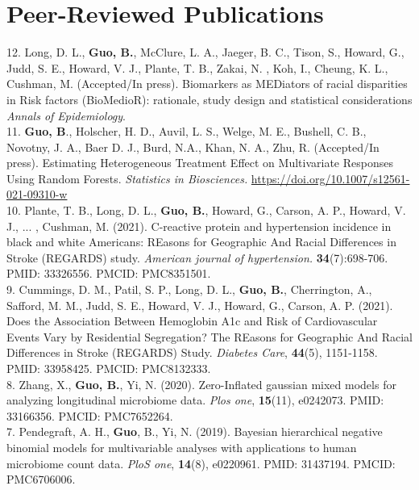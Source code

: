\section{Peer-Reviewed Publications}

\vspace{-3ex}

12. Long, D. L., \textbf{Guo, B.}, McClure, L. A., Jaeger, B. C., Tison, S., Howard, G., Judd, S. E., Howard, V. J., Plante, T. B., Zakai, N. , Koh, I., Cheung, K. L., Cushman, M. (Accepted/In press). Biomarkers as MEDiators of racial disparities in Risk factors (BioMedioR): rationale, study design and statistical considerations \textit{Annals of Epidemiology}. \\

11. {\bf Guo, B}., Holscher, H. D., Auvil, L. S., Welge, M. E., Bushell, C. B., Novotny, J. A., Baer D. J., Burd, N.A., Khan, N. A., Zhu, R. (Accepted/In press). Estimating Heterogeneous Treatment Effect on Multivariate Responses Using Random Forests. {\it Statistics in Biosciences.} \url{https://doi.org/10.1007/s12561-021-09310-w}\\

10. Plante, T. B., Long, D. L., \textbf{Guo, B.}, Howard, G., Carson, A. P., Howard, V. J., ... , Cushman, M. (2021). C-reactive protein and hypertension incidence in black and white Americans: REasons for Geographic And Racial Differences in Stroke (REGARDS) study. \textit{American journal of hypertension.} {\bf 34}(7):698-706. PMID: 33326556. PMCID: PMC8351501. \\

9. Cummings, D. M., Patil, S. P., Long, D. L., {\bf Guo, B.}, Cherrington, A., Safford, M. M., Judd, S. E., Howard, V. J., Howard, G., Carson, A. P. (2021). Does the Association Between Hemoglobin A1c and Risk of Cardiovascular Events Vary by Residential Segregation? The REasons for Geographic And Racial Differences in Stroke (REGARDS) Study. {\it Diabetes Care}, {\bf 44}(5), 1151-1158. PMID: 33958425. PMCID: PMC8132333.\\

8. Zhang, X., {\bf Guo, B.}, Yi, N. (2020). Zero-Inflated gaussian mixed models for analyzing longitudinal microbiome data. {\it Plos one}, {\bf 15}(11), e0242073. PMID: 33166356. PMCID: PMC7652264.\\

7. Pendegraft, A. H., {\bf Guo}, B., Yi, N. (2019). Bayesian hierarchical negative binomial models for multivariable analyses with applications to human microbiome count data. {\it PloS one}, {\bf 14}(8), e0220961. PMID: 31437194. PMCID: PMC6706006.\\

